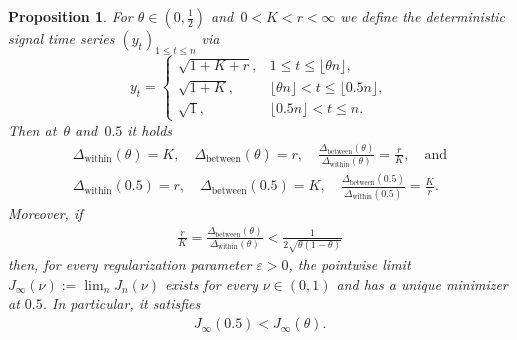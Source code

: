\documentclass[10pt, letterpaper]{amsart}
\newtheorem{proposition}[theorem]{Proposition}
\begin{document}
\begin{proposition}
\label{prop:sharp-A4-fixed-theta}
For $\theta\in(0,\tfrac12)$ and~$0< K < r < \infty$ we define the deterministic signal time series $(y_t)_{1 \leq t \leq n}$ via
\begin{equation}\label{eq:triangular-array-sharpA4}
y_t
=
\begin{cases}
\sqrt{1 + K + r}, & 1 \le t\le \lfloor \theta n\rfloor,\\
\sqrt{1+K}, & \lfloor \theta n\rfloor < t\le \lfloor 0.5  n\rfloor,\\
\sqrt{1}, & \lfloor 0.5  n\rfloor < t\le n .
\end{cases}
\end{equation}
Then at~$\theta$ and~$0.5$ it holds
\begin{align}\label{equ:optimality_signal_and_noise}
  \Delta_{\mathrm{within}} (\theta) = K,
\quad
    \Delta_{\mathrm{between}} (\theta) =r,
\quad
  \frac{\Delta_{\mathrm{between}} (\theta)}{\Delta_{\mathrm{within}} (\theta)}=\frac{r}{K}, \quad \mbox{and}\\
  \Delta_{\mathrm{within}} (0.5) = r,
\quad
    \Delta_{\mathrm{between}} (0.5) =K,
\quad   \frac{\Delta_{\mathrm{between}} (0.5)}{\Delta_{\mathrm{within}} (0.5)}=\frac{K}{r}.\label{equ:optimality_signal_and_noise_at_05}
\end{align}
Moreover, if 
\begin{align}\label{equ:counterexample_conditions}
 \frac{r}{K} = \frac{\Delta_{\mathrm{between}} (\theta)}{\Delta_{\mathrm{within}}(\theta)} < \frac{1}{2 \sqrt{\theta (1- \theta)}}
\end{align}
then, for every regularization parameter $\varepsilon >0$,  the pointwise limit $J_\infty(\nu):=\lim_{n}J_n(\nu)$ exists for every $\nu\in(0,1)$ and has a unique minimizer at $0.5$. In particular, it satisfies
\begin{align}\label{equ:counterexample_energy}
J_\infty(0.5) < J_\infty(\theta).
\end{align}
\end{proposition}

  
\end{document}
